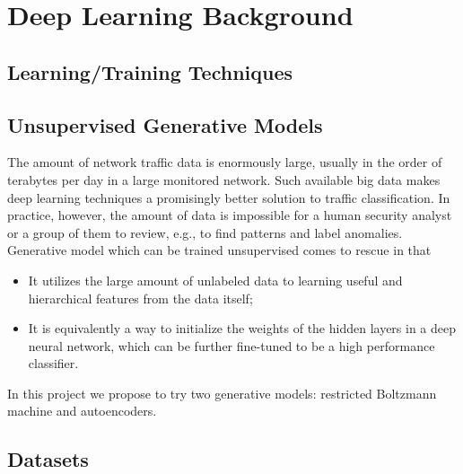 \section{Deep Learning Background}

\subsection{Learning/Training Techniques}

\subsection{Unsupervised Generative Models}
The amount of network traffic data is enormously large, usually in the order of terabytes
per day in a large monitored network.
Such available big data makes deep learning techniques a promisingly better solution
to traffic classification.
In practice, however, the amount of data is impossible for a human security analyst or
a group of them to review, e.g., to find patterns and label anomalies.
Generative model which can be trained unsupervised comes to rescue in that
\begin{itemize}
    \item It utilizes the large amount of unlabeled data to learning useful and hierarchical features
        from the data itself;
    \item It is equivalently a way to initialize the weights of the hidden layers
        in a deep neural network, which can be further fine-tuned to be a high performance classifier.
\end{itemize}
In this project we propose to try two generative models: restricted Boltzmann machine and autoencoders.

\subsection{Datasets}
